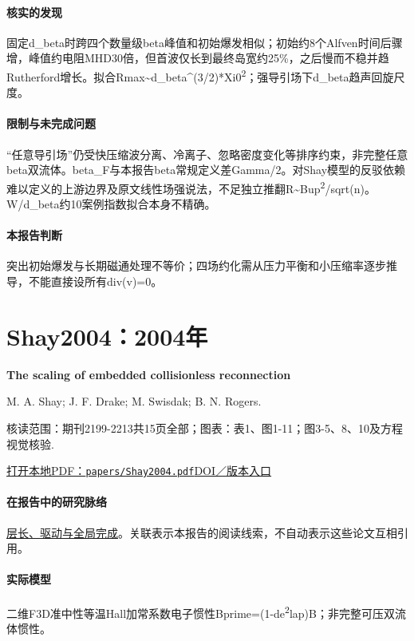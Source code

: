 \documentclass[UTF8,a4paper,11pt,openany,fontset=fandol]{ctexbook}
\begin{document}
\paragraph{核实的发现}固定d\_beta时跨四个数量级beta峰值和初始爆发相似；初始约8个Alfven时间后骤增，峰值约电阻MHD30倍，但首波仅长到最终岛宽约25\%，之后慢而不稳并趋Rutherford增长。拟合Rmax\textasciitilde{}d\_beta\textasciicircum{}(3/2)*Xi0\textsuperscript{2}；强导引场下d\_beta趋声回旋尺度。

\paragraph{限制与未完成问题}“任意导引场”仍受快压缩波分离、冷离子、忽略密度变化等排序约束，非完整任意beta双流体。beta\_F与本报告beta常规定义差Gamma/2。对Shay模型的反驳依赖难以定义的上游边界及原文线性场强说法，不足独立推翻R\textasciitilde{}Bup\textsuperscript{2}/sqrt(n)。W/d\_beta约10案例指数拟合本身不精确。

\paragraph{本报告判断}突出初始爆发与长期磁通处理不等价；四场约化需从压力平衡和小压缩率逐步推导，不能直接设所有div(v)=0。

\section{Shay2004：2004年}\label{paper:Shay2004}

\textbf{The scaling of embedded collisionless reconnection}\citep{Shay2004}\

M. A. Shay;  J. F. Drake;  M. Swisdak;  B. N. Rogers.

\textsf{核读范围：}期刊2199-2213共15页全部；\textsf{图表：}表1、图1-11；图3-5、8、10及方程视觉核验.

\href{run:../papers/Shay2004.pdf}{打开本地PDF：\texttt{papers/Shay2004.pdf}}\quad\href{https://doi.org/10.1063/1.1705650}{DOI／版本入口}

\paragraph{在报告中的研究脉络}\hyperref[story:global]{层长、驱动与全局完成}。关联表示本报告的阅读线索，不自动表示这些论文互相引用。

\paragraph{实际模型}二维F3D准中性等温Hall加常系数电子惯性Bprime=(1-de\textsuperscript{2}lap)B；非完整可压双流体惯性。
\end{document}
